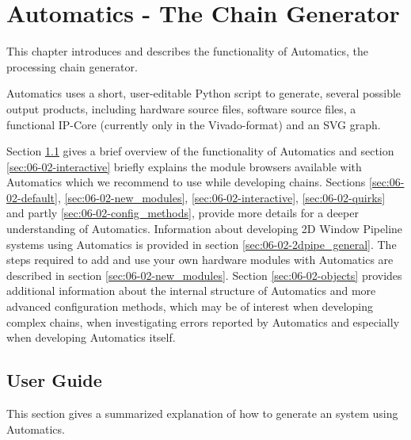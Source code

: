


\section{Automatics - The Chain Generator} \label{ch:06-02-tools-generator}


This chapter introduces and describes the functionality of Automatics, the \asterics processing chain generator.

Automatics uses a short, user-editable Python script to generate, several possible output products, including hardware source files, software source files, a functional IP-Core (currently only in the Vivado-format) and an SVG graph.

Section \ref{sec:06-02-user_guide} gives a brief overview of the functionality of Automatics and section \ref{sec:06-02-interactive} briefly explains the module browsers available with Automatics which we recommend to use while developing \asterics chains.
Sections \ref{sec:06-02-default}, \ref{sec:06-02-new_modules}, \ref{sec:06-02-interactive}, \ref{sec:06-02-quirks} and partly \ref{sec:06-02-config_methods}, provide more details for a deeper understanding of Automatics.
Information about developing 2D Window Pipeline systems using Automatics is provided in section \ref{sec:06-02-2dpipe_general}.
The steps required to add and use your own hardware modules with Automatics are described in section \ref{sec:06-02-new_modules}.
Section \ref{sec:06-02-objects} provides additional information about the internal structure of Automatics and more advanced configuration methods, which may be of interest when developing complex \asterics chains, when investigating errors reported by Automatics and especially when developing Automatics itself.

\subsection{User Guide}
\label{sec:06-02-user_guide}

This section gives a summarized explanation of how to generate an \asterics system using Automatics.

